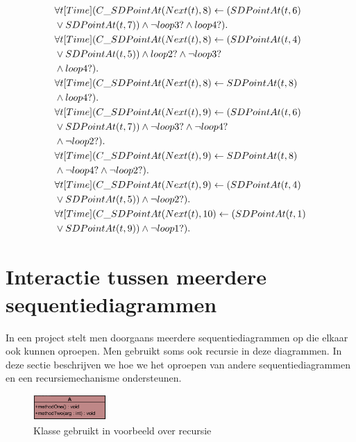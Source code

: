 \begin{align*}
	&\forall{t}[Time](C\_SDPointAt(Next(t), 8) \leftarrow (SDPointAt(t, 6) \\ &\lor SDPointAt(t, 7)) \land \lnot loop3? \land loop4?). \\
	&\forall{t}[Time](C\_SDPointAt(Next(t), 8) \leftarrow (SDPointAt(t, 4) \\ &\lor SDPointAt(t, 5)) \land loop2? \land \lnot loop3? \\ &\land loop4?). \\
	&\forall{t}[Time](C\_SDPointAt(Next(t), 8) \leftarrow SDPointAt(t, 8) \\ &\land loop4?). \\
	&\forall{t}[Time](C\_SDPointAt(Next(t), 9) \leftarrow (SDPointAt(t, 6) \\ &\lor SDPointAt(t, 7)) \land \lnot loop3? \land \lnot loop4? \\ &\land \lnot loop2?). \\
	&\forall{t}[Time](C\_SDPointAt(Next(t), 9) \leftarrow SDPointAt(t, 8) \\ &\land \lnot loop4? \land \lnot loop2?). \\
	&\forall{t}[Time](C\_SDPointAt(Next(t), 9) \leftarrow (SDPointAt(t, 4) \\ &\lor SDPointAt(t, 5)) \land \lnot loop2?). \\
	&\forall{t}[Time](C\_SDPointAt(Next(t), 10) \leftarrow (SDPointAt(t, 1) \\ &\lor SDPointAt(t, 9)) \land \lnot loop1?).
\end{align*}

\section{Interactie tussen meerdere sequentiediagrammen}\label{sec:interaction}
In een project stelt men doorgaans meerdere sequentiediagrammen op die elkaar ook kunnen oproepen. Men gebruikt soms ook recursie in deze diagrammen. In deze sectie beschrijven we hoe we het oproepen van andere sequentiediagrammen en een recursiemechanisme ondersteunen.

\begin{figure}
	\centering
	\includegraphics[width=0.25\textwidth]{chap-gedrag/recursion-class.png}
	\caption{Klasse gebruikt in voorbeeld over recursie}
	\label{fig:recursion-class}
\end{figure}

